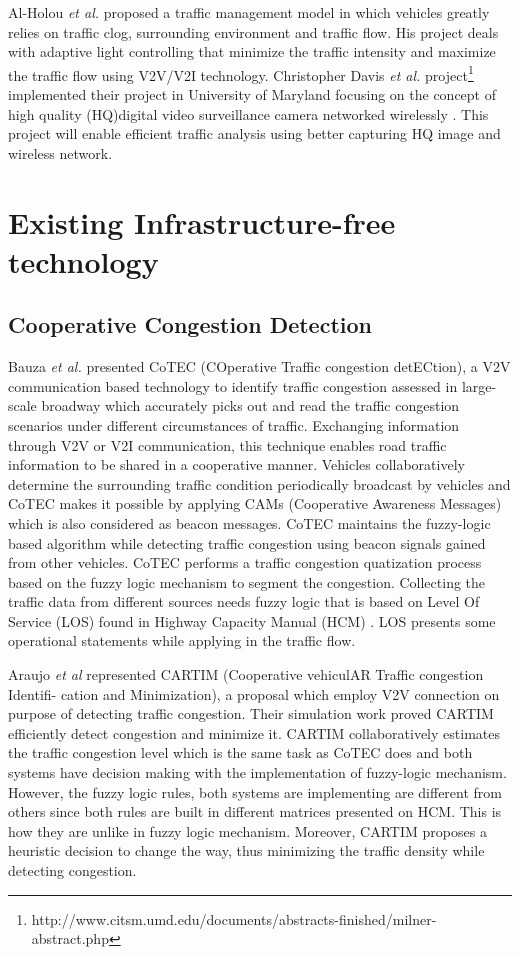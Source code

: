 \documentclass[conference]{IEEEtran}
\begin{document}
Al-Holou \textit{et al.} \cite{al2012multi} proposed a traffic management model in which vehicles greatly relies on traffic clog, surrounding environment and traffic flow. His project deals with adaptive light controlling that minimize the traffic intensity and maximize the traffic flow using V2V/V2I technology. Christopher Davis \textit{et al.} project\footnote{http://www.citsm.umd.edu/documents/abstracts-finished/milner-abstract.php} implemented their project in University of Maryland focusing on the concept of high quality (HQ)digital video surveillance camera networked wirelessly . This project will enable efficient traffic analysis using better capturing HQ image and wireless network.

\section{Existing Infrastructure-free technology}
\subsection{Cooperative Congestion Detection}

Bauza \textit{et al.}\cite{bauza2013traffic} presented CoTEC (COperative Traffic congestion detECtion), a V2V communication based technology to identify traffic congestion assessed in large-scale broadway which accurately picks out and read the traffic congestion scenarios under different circumstances of traffic. Exchanging information through V2V or V2I communication, this technique enables road traffic information to be shared in a cooperative manner. Vehicles collaboratively determine the surrounding traffic condition periodically broadcast by vehicles and CoTEC makes it possible by applying CAMs (Cooperative Awareness Messages) which is also considered as beacon messages. CoTEC maintains the fuzzy-logic based algorithm while detecting traffic congestion using beacon signals gained from other vehicles. CoTEC performs a traffic congestion quatization process based on the fuzzy logic mechanism to segment the congestion. Collecting the traffic data from different sources needs fuzzy logic that is based on Level Of Service (LOS) found in Highway Capacity Manual (HCM) . LOS presents some operational statements while applying in the traffic flow. 

Araujo \textit{et al} \cite{araujo2014cartim} represented CARTIM (Cooperative vehiculAR Traffic congestion Identifi-
cation and Minimization), a proposal which employ V2V connection on purpose of detecting traffic congestion. Their simulation work proved CARTIM efficiently detect congestion and minimize it. CARTIM collaboratively estimates the traffic congestion level which is the same task as CoTEC does and both systems have decision making with the implementation of fuzzy-logic mechanism. However, the fuzzy logic rules, both systems are implementing are different from others since both rules are built in different matrices presented on HCM. This is how they are unlike in fuzzy logic mechanism. Moreover, CARTIM proposes a heuristic decision to change the way, thus minimizing the traffic density while detecting congestion. 
\end{document}
